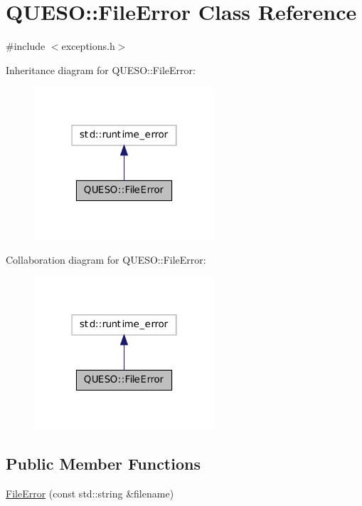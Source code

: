 \hypertarget{class_q_u_e_s_o_1_1_file_error}{\section{Q\-U\-E\-S\-O\-:\-:File\-Error Class Reference}
\label{class_q_u_e_s_o_1_1_file_error}
}


{\ttfamily \#include $<$exceptions.\-h$>$}



Inheritance diagram for Q\-U\-E\-S\-O\-:\-:File\-Error\-:
\nopagebreak
\begin{figure}[H]
\begin{center}
\leavevmode
\includegraphics[width=190pt]{class_q_u_e_s_o_1_1_file_error__inherit__graph}
\end{center}
\end{figure}


Collaboration diagram for Q\-U\-E\-S\-O\-:\-:File\-Error\-:
\nopagebreak
\begin{figure}[H]
\begin{center}
\leavevmode
\includegraphics[width=190pt]{class_q_u_e_s_o_1_1_file_error__coll__graph}
\end{center}
\end{figure}
\subsection*{Public Member Functions}
\begin{DoxyCompactItemize}
\item 
\hyperlink{class_q_u_e_s_o_1_1_file_error_a3832f21b43e99c46bc29ee904e8dedfc}{File\-Error} (const std\-::string \&filename)
\end{DoxyCompactItemize}


